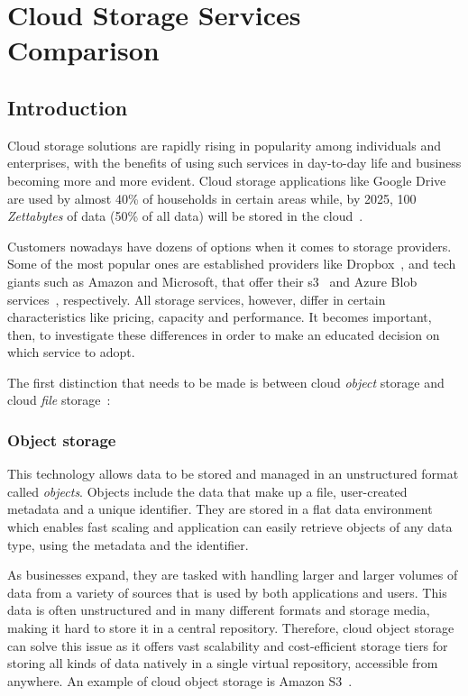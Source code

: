 \chapter{Cloud Storage Services Comparison}\label{ch:cloud-storage-services-comparison}

\section{Introduction}
Cloud storage solutions are rapidly rising in popularity among individuals and enterprises, with the benefits of using such services in day-to-day life and business becoming more and more evident. Cloud storage applications like Google Drive are used by almost 40\% of households in certain areas while, by 2025, 100 \textit{Zettabytes} of data (50\% of all data) will be stored in the cloud~\cite{zeta}.

Customers nowadays have dozens of options when it comes to storage providers. Some of the most popular ones are established providers like Dropbox~\cite{dropbox}, and tech giants such as Amazon and Microsoft, that offer their \ac{s3}~\cite{s3} and Azure Blob services~\cite{blob}, respectively. All storage services, however, differ in certain characteristics like pricing, capacity and performance. It becomes important, then, to investigate these differences in order to make an educated decision on which service to adopt.

The first distinction that needs to be made is between cloud \textit{object} storage and cloud \textit{file} storage~\cite{objectvsfile, objectvsfile2}:

\subsection{Object storage}
This technology allows data to be stored and managed in an unstructured format called \textit{objects}. Objects include the data that make up a file, user-created metadata and a unique identifier. They are stored in a flat data environment which enables fast scaling and application can easily retrieve objects of any data type, using the metadata and the identifier.

As businesses expand, they are tasked with handling larger and larger volumes of data from a variety of sources that is used by both applications and users. This data is often unstructured and in many different formats and storage media, making it hard to store it in a central repository. Therefore, cloud object storage can solve this issue as it offers vast scalability and cost-efficient storage tiers for storing all kinds of data natively in a single virtual repository, accessible from anywhere. An example of cloud object storage is Amazon S3~\cite{s3}.

